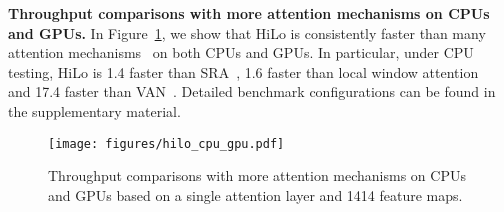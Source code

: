 \textbf{Throughput comparisons with more attention mechanisms on CPUs and GPUs.} In Figure~\ref{fig:hilo_speed_cpu_gpu}, we show that HiLo is consistently faster than many attention mechanisms~\cite{pvt,swin,xcit,linformer,performer,dong2021cswin,dat,yang2021focal,rao2022hornet,tang2022quadtree,van,vit} on both CPUs and GPUs. In particular, under CPU testing, HiLo is 1.4 faster than SRA~\cite{pvt}, 1.6 faster than local window attention~\cite{swin} and 17.4 faster than VAN~\cite{van}.
Detailed benchmark configurations can be found in the supplementary material.


\begin{figure}[]
	\centering
\texttt{[image: figures/hilo\_cpu\_gpu.pdf]}
\caption{Throughput comparisons with more attention mechanisms on CPUs and GPUs based on a single attention layer and 1414 feature maps.}
	\label{fig:hilo_speed_cpu_gpu}
	\vspace{-7mm}
\end{figure}

